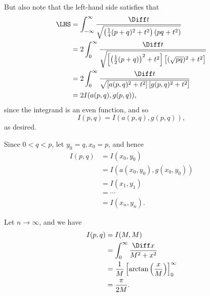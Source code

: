 \begin{enumerate}
          But also note that the left-hand side satisfies that
          \begin{align*}
              \LHS & = \int_{-\infty}^{\infty} \frac{\Diff t}{\sqrt{\left(\frac{1}{4} (p + q)^2 + t^2\right) \left(pq + t^2\right)}}                    \\
                   & = 2 \int_{0}^{\infty} \frac{\Diff t}{\sqrt{\left[\left(\frac{1}{2} (p + q)\right)^2 + t^2\right]\left[(\sqrt{pq})^2 + t^2\right]}} \\
                   & = 2 \int_{0}^{\infty} \frac{\Diff t}{\sqrt{\left[a(p, q)^2 + t^2\right]\left[g(p, q)^2 + t^2\right]}}                              \\
                   & = 2 I(a(p, q), g(p, q)),
          \end{align*}
          since the integrand is an even function, and so
          \[
              I(p, q) = I(a(p, q), g(p, q)),
          \]
          as desired.

          Since \(0 < q < p\), let \(y_0 = q, x_0 = p\), and hence
          \begin{align*}
              I(p, q) & = I(x_0, y_0)                 \\
                      & = I(a(x_0, y_0), g(x_0, y_0)) \\
                      & = I(x_1, y_1)                 \\
                      & = \cdots                      \\
                      & = I(x_n, y_n).
          \end{align*}

          Let \(n \to \infty\), and we have
          \begin{align*}
              I(p, q) & = I(M, M)                                                               \\
                      & = \int_{0}^{\infty} \frac{\Diff x}{M^2 + x^2}                           \\
                      & = \frac{1}{M} \left[\arctan\left(\frac{x}{M}\right)\right]_{0}^{\infty} \\
                      & = \frac{\pi}{2M}.
          \end{align*}
\end{enumerate}